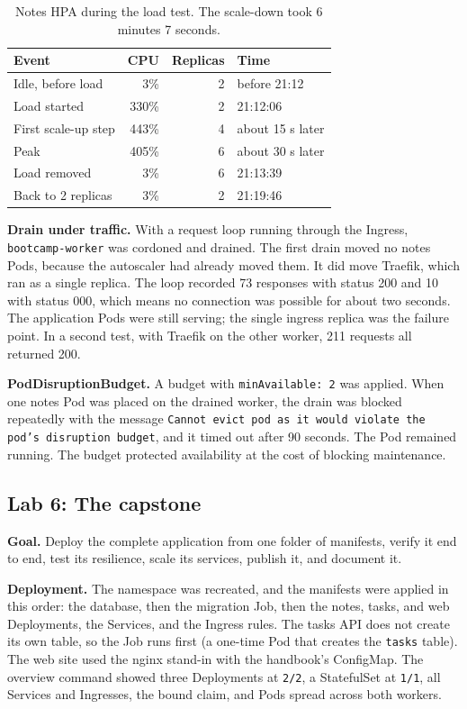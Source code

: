 \documentclass[11pt,a4paper]{article}
\begin{document}
\begin{table}[H]
\centering
\begin{tabular}{@{}lrrl@{}}
\toprule
Event & CPU & Replicas & Time \\
\midrule
Idle, before load & 3\% & 2 & before 21:12 \\
Load started & 330\% & 2 & 21:12:06 \\
First scale-up step & 443\% & 4 & about 15 s later \\
Peak & 405\% & 6 & about 30 s later \\
Load removed & 3\% & 6 & 21:13:39 \\
Back to 2 replicas & 3\% & 2 & 21:19:46 \\
\bottomrule
\end{tabular}
\caption{Notes HPA during the load test. The scale-down took 6 minutes 7 seconds.}
\end{table}

\textbf{Drain under traffic.} With a request loop running through the Ingress, \texttt{bootcamp-worker} was cordoned and drained. The first drain moved no notes Pods, because the autoscaler had already moved them. It did move Traefik, which ran as a single replica. The loop recorded 73 responses with status 200 and 10 with status 000, which means no connection was possible for about two seconds. The application Pods were still serving; the single ingress replica was the failure point. In a second test, with Traefik on the other worker, 211 requests all returned 200.

\textbf{PodDisruptionBudget.} A budget with \texttt{minAvailable: 2} was applied. When one notes Pod was placed on the drained worker, the drain was blocked repeatedly with the message \texttt{Cannot evict pod as it would violate the pod's disruption budget}, and it timed out after 90 seconds. The Pod remained running. The budget protected availability at the cost of blocking maintenance.

\subsection{Lab 6: The capstone}
\textbf{Goal.} Deploy the complete application from one folder of manifests, verify it end to end, test its resilience, scale its services, publish it, and document it.

\textbf{Deployment.} The namespace was recreated, and the manifests were applied in this order: the database, then the migration Job, then the notes, tasks, and web Deployments, the Services, and the Ingress rules. The tasks API does not create its own table, so the Job runs first (a one-time Pod that creates the \texttt{tasks} table). The web site used the nginx stand-in with the handbook's ConfigMap. The overview command showed three Deployments at \texttt{2/2}, a StatefulSet at \texttt{1/1}, all Services and Ingresses, the bound claim, and Pods spread across both workers.
\end{document}
